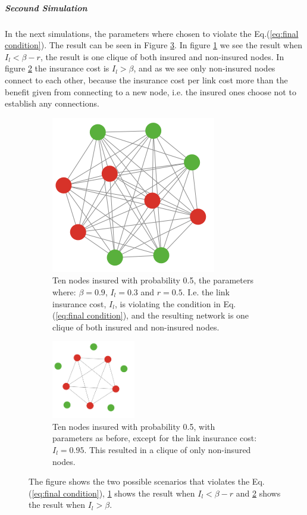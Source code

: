 \subparagraph{Secound Simulation}
In the next simulations, the parameters where chosen to violate the Eq.(\ref{eq:final condition}). The result can be seen in Figure \ref{fig:SimulationViolating}.  In figure \ref{fig:SimulationViolating:a} we see the result when $I_{l}<\beta-r$, the result is one clique of both insured and non-insured nodes. In figure \ref{fig:SimulationViolating:b} the insurance cost is $I_{l}>\beta$, and as we see only non-insured nodes connect to each other, because the insurance cost per link cost more than the benefit given from connecting to a new node, i.e. the insured ones choose not to establish any connections. 
\begin{figure}[h]
\centering
\begin{subfigure}{.5\textwidth}
  \centering
\includegraphics[width=0.4\linewidth]{../Figures/FirstSimulationViolatingResult.png}

\caption{\label{fig:SimulationViolating:a} Ten nodes insured with probability 0.5, the parameters where: $\beta=0.9$, $I_{l}=0.3$ and $r=0.5$. I.e. the link insurance cost, $I_{l}$, is violating the condition in Eq.(\ref{eq:final condition}), and the resulting network is one clique of both insured and non-insured nodes.}
\end{subfigure}
\quad
\begin{subfigure}{0.46\textwidth}
\centering
\includegraphics[width=0.4\textwidth]{../Figures/SimulationViolating2.png}

\caption{\label{fig:SimulationViolating:b} Ten nodes insured with probability 0.5, with parameters as before, except for the link insurance cost:$I_{l}=0.95$. This resulted in a clique of only non-insured nodes. }
\end{subfigure}
\caption{\label{fig:SimulationViolating} The figure shows the two possible scenarios that violates the Eq.(\ref{eq:final condition}), \ref{fig:SimulationViolating:a} shows the result when $I_{l}<\beta-r$ and \ref{fig:SimulationViolating:b} shows the result when $I_{l}>\beta$.}
\end{figure}

